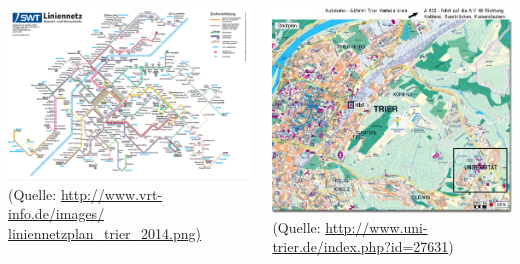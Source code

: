 
\begin{frame}
	
	\begin{columns}
			\includegraphics[scale=0.3]{./pictures/liniennetz.png}
			\\
				{\tiny (Quelle: \url{http://www.vrt-info.de/images/											liniennetzplan_trier_2014.png)}} 
				
			\includegraphics[scale=0.4]{./pictures/stadtplan_02.jpg}
			\\
			{ \tiny
				(Quelle: \url{http://www.uni-trier.de/index.php?id=27631})
			}
	\end{columns}
\end{frame}


